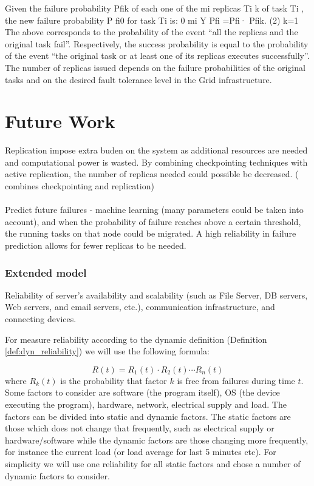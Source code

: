 \documentclass{cslthse-msc}
\begin{document}
Given the failure probability Pfik of each one of the mi replicas Ti k of task Ti , the new failure probability P fi0 for task Ti is:
0 mi Y
Pfi =Pfi· Pfik. (2) k=1
The above corresponds to the probability of the event “all the replicas and the original task fail”. Respectively, the success probability is equal to the probability of the event “the original task or at least one of its replicas executes successfully”. The number of replicas issued depends on the failure probabilities of the original tasks and on the desired fault tolerance level in the Grid infrastructure.  \cite{effTaskReplMobGrid}


\chapter{Future Work} \label{ch:future_work}
Replication impose extra buden on the system as additional resources are needed and computational power is wasted. By combining checkpointing techniques with active replication, the number of replicas needed could possible be decreased. (\cite{adaptiveCheckPointAndRep} combines checkpointing and replication)
\\\\
Predict future failures - machine learning (many parameters could be taken into account), and when the probability of failure reaches above a certain threshold, the running tasks on that node could be migrated. A high reliability in failure prediction allows for fewer replicas to be needed.

\subsection{Extended model}
Reliability of server’s availability and scalability (such as File Server, DB servers, Web servers, and email servers, etc.), communication infrastructure, and connecting devices. \cite{surveyReliabilityDistr}

For measure reliability according to the dynamic definition (Definition \ref{def:dyn_reliability}) we will use the following formula:

\begin{equation} \label{eq:overall_reliability}
R(t) = R_{1}(t) \cdot R_{2}(t) \cdots R_{n}(t)
\end{equation}
where $R_{k}(t)$ is the probability that factor $k$ is free from failures during time $t$. Some factors to consider are software (the program itself), OS (the device executing the program), hardware, network, electrical supply and load. The factors can be divided into static and dynamic factors. The static factors are those which does not change that frequently, such as electrical supply or hardware/software while the dynamic factors are those changing more frequently, for instance the current load (or load average for last 5 minutes etc). For simplicity we will use one reliability for all static factors and chose a number of dynamic factors to consider.
\end{document}

